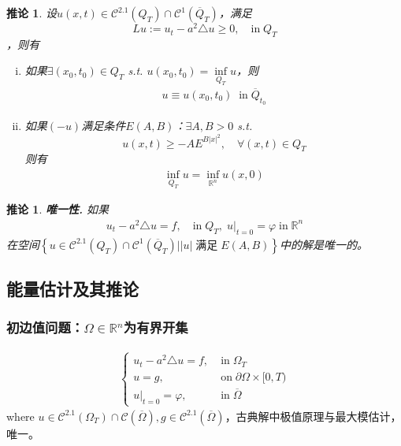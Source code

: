 \documentclass[11pt, a4paper]{article}
\theoremstyle{theorem}
\newtheorem{cor}[thm]{推论}
\begin{document}
\begin{cor}
设$u(x,t) \in \mathcal{C}^{2.1} (Q_T) \cap \mathcal{C}^1(\overline{Q}_T)$，满足
$$
L u := u_t - a^2 \triangle u \geq 0, \quad \text{in} \; Q_T
$$
，则有
\begin{enumerate}[(i)]
  \item 如果$\exists (x_0,t_0) \in Q_T$ s.t. $u(x_0,t_0) = \inf\limits_{Q_T} u$，则
  \begin{align}
      u \equiv u(x_0,t_0) \; \; \text{in} \; \overline{Q}_{t_0}
  \end{align}
  \item 如果$(-u)$满足条件$E(A,B)$：$\exists A,B > 0$ s.t.
  $$
  u(x,t) \geq - A E^{B|x|^2}, \quad \forall (x,t) \in Q_T
  $$
  则有
  \begin{align}
      \inf\limits_{Q_T} u = \inf\limits_{\mathbb{R}^n} u(x,0)
  \end{align}
\end{enumerate}
\end{cor}

\begin{cor} \textbf{唯一性.} 如果
\begin{align}
    u_t - a^2 \triangle u = f, \quad \text{in} \; Q_T, \; u\bigg|_{t = 0} = \varphi \; \text{in} \; \mathbb{R}^n
\end{align}
在空间$\left\{u \in \mathcal{C}^{2.1} (Q_T) \cap \mathcal{C}^1(\overline{Q}_T) \bigg| |u| \; \text{满足} \; E(A,B)\right\}$中的解是唯一的。
\end{cor}

\subsection{能量估计及其推论}

\subsubsection{初边值问题：$\Omega \in \mathbb{R}^n$为有界开集}

\begin{align}
\label{Q4-9-1}
  \begin{cases}
    u_t - a^2 \triangle u = f, \; &\text{in} \; \Omega_T \\
    u = g, \; &\text{on} \; \partial \Omega \times [0,T) \\
    u \bigg|_{t = 0} = \varphi, \; &\text{in} \; \overline{\Omega}
  \end{cases}
\end{align}
where $u \in \mathcal{C}^{2.1}(\Omega_T) \cap \mathcal{C}(\overline{\Omega}), g \in \mathcal{C}^{2.1}(\overline{\Omega})$，古典解中极值原理与最大模估计，唯一。
\end{document}
